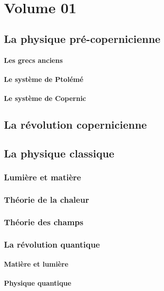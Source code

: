 \chapter{Volume 01}

\section{La physique pré-copernicienne}
    \subsubsection{Les grecs anciens}
    \subsubsection{Le système de Ptolémé}
    \subsubsection{Le système de Copernic}

\section{La révolution copernicienne}

\section{La physique classique}
  \subsection{Lumière et matière}
  \subsection{Théorie de la chaleur}
  \subsection{Théorie des champs}

\subsection{La révolution quantique}
    \subsubsection{Matière et lumière}
    \subsubsection{Physique quantique}

